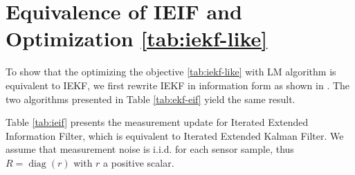 \section{Equivalence of IEIF and Optimization \ref{tab:iekf-like}} \label{app:ieif-lm}

To show that the optimizing the objective  \ref{tab:iekf-like} with LM algorithm is equivalent to IEKF, we first rewrite IEKF in information form as shown in \cite{anderson1979optimal}. The two algorithms presented in Table \ref{tab:ekf-eif} yield the same result.

\begin{table}[!h] 
\centering
\caption{EKF vs EIF measurement update \label{tab:ekf-eif}} 
\end{table}

Table \ref{tab:ieif} presents the measurement update for Iterated Extended Information Filter, which is equivalent to Iterated Extended Kalman Filter. We assume that measurement noise is i.i.d. for each sensor sample, thus $R = \operatorname{diag}(r)$ with $r$ a positive scalar.

